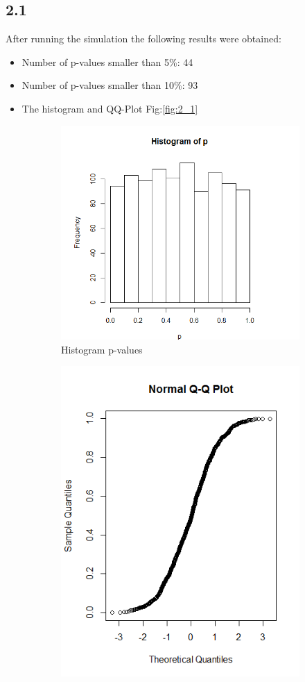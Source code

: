 \documentclass{article}
\begin{document}
    \subsection{2.1}
      After running the simulation the following results were obtained:
      \begin{itemize}
        \item Number of p-values smaller than 5\%: 44
        \item Number of p-values smaller than 10\%: 93
        \item The histogram and QQ-Plot Fig:\ref{fig:2_1}
      \end{itemize}

      \begin{figure}[!htb]
      \begin{subfigure}{.5\textwidth}
        \centering
        \includegraphics[width=.8\linewidth]{results/2_1}
        \caption{Histogram p-values}
        \end{subfigure}
        \begin{subfigure}{.5\textwidth}
        \centering
        \includegraphics[width=.8\linewidth]{results/2_1_2}

\end{subfigure}
\end{figure}
\end{document}
